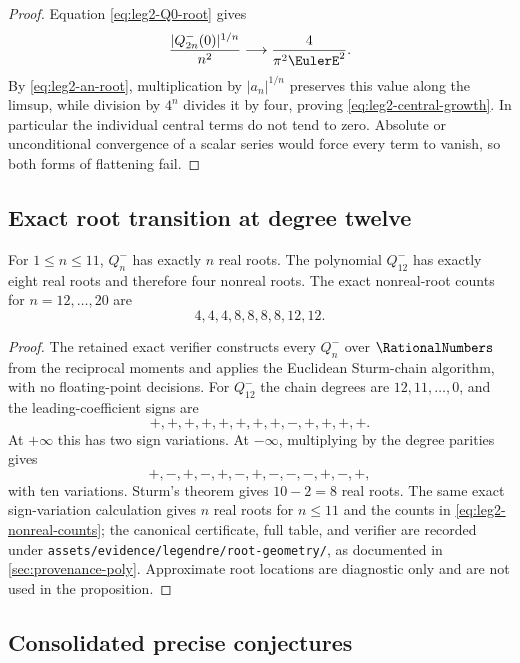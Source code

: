 \begin{proof}
Equation \eqref{eq:leg2-Q0-root} gives
\[
 \frac{|Q_{2n}^-(0)|^{1/n}}{n^2}\longrightarrow
 \frac4{\pi^2\EulerE^2}.
\]
By \eqref{eq:leg2-an-root}, multiplication by $|a_n|^{1/n}$ preserves this
value along the limsup, while division by $4^n$ divides it by four, proving
\eqref{eq:leg2-central-growth}.  In particular the individual central terms
do not tend to zero.  Absolute or unconditional convergence of a scalar
series would force every term to vanish, so both forms of flattening fail.
\end{proof}

\subsection{Exact root transition at degree twelve}

\begin{proposition}
\label{prop:leg2-Q12-nonreal}
For $1\le n\le11$, $Q_n^-$ has exactly $n$ real roots.  The polynomial
$Q_{12}^-$ has exactly eight real roots and therefore four nonreal roots.
The exact nonreal-root counts for $n=12,\ldots,20$ are
\begin{equation}
 4,4,4,8,8,8,8,12,12.
 \label{eq:leg2-nonreal-counts}
\end{equation}
\end{proposition}

\begin{proof}
The retained exact verifier constructs every $Q_n^-$ over $\RationalNumbers$ from the
reciprocal moments and applies the Euclidean Sturm-chain algorithm, with no
floating-point decisions.  For $Q_{12}^-$ the chain degrees are
$12,11,\ldots,0$, and the leading-coefficient signs are
\[
 +,+,+,+,+,+,+,+,-,+,+,+,+.
\]
At $+\infty$ this has two sign variations.  At $-\infty$, multiplying by the
degree parities gives
\[
 +,-,+,-,+,-,+,-,-,-,+,-,+,
\]
with ten variations.  Sturm's theorem gives $10-2=8$ real roots.  The same
exact sign-variation calculation gives $n$ real roots for $n\le11$ and the
counts in \eqref{eq:leg2-nonreal-counts}; the canonical certificate, full
table, and verifier are recorded under
\nolinkurl{assets/evidence/legendre/root-geometry/}, as documented in
\cref{sec:provenance-poly}.  Approximate
root locations are diagnostic only and are not used in the proposition.
\end{proof}

\subsection{Consolidated precise conjectures}

